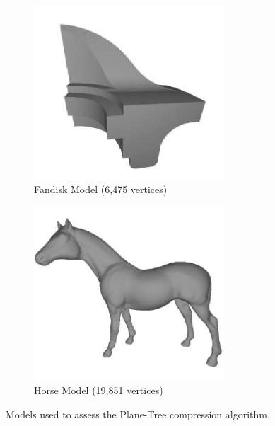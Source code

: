 \begin{figure}[H]
\begin{center}
\begin{subfigure}[b]{3in}
                \label{fig:MODELSUSEDA_RABBIT}
        \end{subfigure}
        \begin{subfigure}[b]{3in}
                \includegraphics[width=2.8in]{images/experiments/test_data/models_used/fandisk_6475}
                \captionsetup{justification=centering}
                \caption{Fandisk Model (6,475 vertices)}
                \label{fig:MODELSUSEDA_FANDISK}
        \end{subfigure}%
        \begin{subfigure}[b]{3in}
                \includegraphics[width=2.8in]{images/experiments/test_data/models_used/horse_19851}
                \captionsetup{justification=centering}
                \caption{Horse Model (19,851 vertices)}
                \label{fig:MODELSUSEDA_HORSE}
        \end{subfigure}
       \caption{Models used to assess the Plane-Tree compression algorithm.}
       \label{fig:MODELSUSEDA}
       \end{center}
\end{figure}




